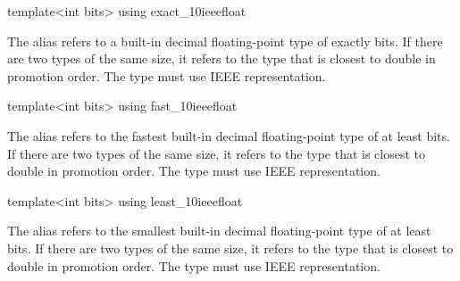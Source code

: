 \begin{addedblock}
\begin{itemdecl}
template<int bits> using exact_10ieeefloat
\end{itemdecl}

\begin{itemdescr}
The alias  refers to a built-in decimal floating-point type of exactly  bits. If there are two types of the same size, it refers to the type that is closest to double in promotion order. The type must use IEEE representation.
\end{itemdescr}

\begin{itemdecl}
template<int bits> using fast_10ieeefloat
\end{itemdecl}

\begin{itemdescr}
The alias  refers to the fastest built-in decimal floating-point type of at least  bits. If there are two types of the same size, it refers to the type that is closest to double in promotion order. The type must use IEEE representation.
\end{itemdescr}

\begin{itemdecl}
template<int bits> using least_10ieeefloat
\end{itemdecl}

\begin{itemdescr}
The alias  refers to the smallest built-in decimal floating-point type of at least  bits. If there are two types of the same size, it refers to the type that is closest to double in promotion order. The type must use IEEE representation.
\end{itemdescr}
\end{addedblock}
